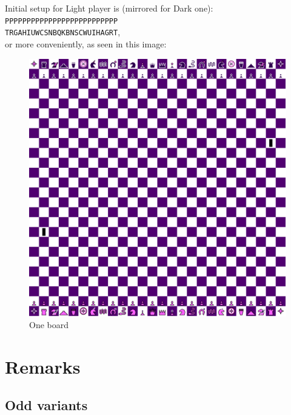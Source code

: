 \documentclass[a5paper,12pt,draft]{book} %
\begin{document}
Initial setup for Light player is (mirrored for Dark one):
\texttt{PPPPPPPPPPPPPPPPPPPPPPPPPP \\
        TRGAHIUWCSNBQKBNSCWUIHAGRT}, \\
or more conveniently, as seen in this image:

\noindent
\begin{figure}[h]
\includegraphics[width=1.0\textwidth, keepaspectratio=true]{../gfx/boards/22_one.png}
\caption{One board}
\label{fig:one}
\end{figure}

\clearpage

\chapter*{Remarks}

\section*{Odd variants}
\end{document}
